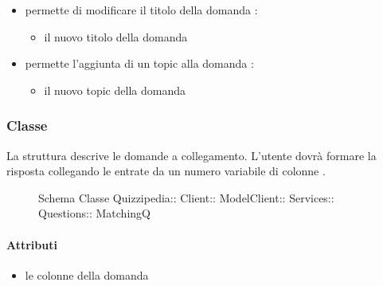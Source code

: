 \begin{itemize}
\begin{itemize}
\end{itemize}
\item {}
\newline
permette di modificare il titolo della domanda
\newline
{} :
\begin{itemize}
\item {}
\newline
il nuovo titolo della domanda
\end{itemize}
\item {}
\newline
permette l'aggiunta di un topic alla domanda
\newline
{} :
\begin{itemize}
\item {}
\newline
il nuovo topic della domanda
\end{itemize}
\end{itemize}
\subsubsection{Classe }
La struttura descrive le domande a collegamento. L'utente dovrà formare la risposta collegando le entrate da un numero variabile di colonne .
\begin{figure}[H]
\centering
\noindent{}
\caption[Schema Classe MatchingQ]{Schema Classe Quizzipedia:: Client:: ModelClient:: Services:: Questions:: MatchingQ}
\end{figure}
\paragraph{Attributi}
\begin{itemize}
\item {}
\newline
le colonne della domanda
\end{itemize}
